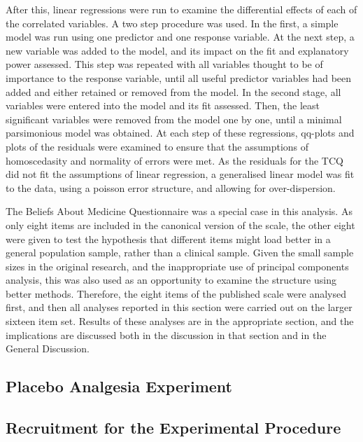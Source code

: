 After this, linear regressions were run to examine the differential effects of each of the correlated variables. A two step procedure was used. In the first, a simple model was run using one predictor and one response variable. At the next step, a new variable was added to the model, and its impact on the fit and explanatory power assessed. This step was repeated with all variables thought to be of importance to the response variable, until all useful predictor variables had been added and either retained or removed from the model. In the second stage, all variables were entered into the model and its fit assessed. Then, the least significant variables were removed from the model one by one, until a minimal parsimonious model was obtained. At each step of these regressions, qq-plots and plots of the residuals were examined to ensure that the assumptions of homoscedasity and normality of errors were met. As the residuals for the TCQ did not fit the assumptions of linear regression, a generalised linear model was fit to the data, using a poisson error structure, and allowing for over-dispersion. 

The Beliefs About Medicine Questionnaire was a special case in this analysis. As only eight items are included in the canonical version of the scale, the other eight were given to test the hypothesis that different items might load better in a general population sample, rather than a clinical sample. Given the small sample sizes in the original research, and the inappropriate use of principal components analysis, this was also used as an opportunity to examine the structure using better methods. Therefore, the eight items of the published scale were analysed first, and then all analyses reported in this section were carried out on the larger sixteen item set. Results of these analyses are in the appropriate section, and the implications are discussed both in the discussion in that section and in the General Discussion. 


\subsection{Placebo Analgesia Experiment}

\subsection{Recruitment for the Experimental Procedure}

